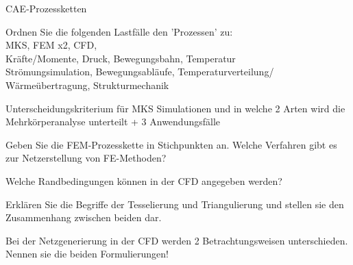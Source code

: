 \documentclass[
	ngerman,
	color = black,
	]{tudaexercise}
\begin{document}
\begin{task}[credit=18{,}5 P]{CAE-Prozessketten}
	\begin{subtask}[credit=2 P]
		Ordnen Sie die folgenden Lastfälle den 'Prozessen' zu: \\
		MKS, FEM x2, CFD, \\
		Kräfte/Momente, Druck, Bewegungsbahn, Temperatur \\
		Strömungsimulation, Bewegungsabläufe, Temperaturverteilung/ Wärmeübertragung, Strukturmechanik %
	\end{subtask}
	
	\begin{subtask}[credit=4 P]
		Unterscheidungskriterium für MKS Simulationen und in welche 2 Arten wird die Mehrkörperanalyse unterteilt
		+ 3 Anwendungsfälle %
	\end{subtask}	
	
	\begin{subtask}[credit=4 P]
		Geben Sie die FEM-Prozesskette in Stichpunkten an.
		Welche Verfahren gibt es zur Netzerstellung von FE-Methoden?
	\end{subtask}
	
	\begin{subtask}[credit=2{,}5 P]
		Welche Randbedingungen können in der CFD angegeben werden?
	\end{subtask}
	
	\begin{subtask}[credit=4 P]
		Erklären Sie die Begriffe der Tesselierung und Triangulierung und stellen sie den Zusammenhang zwischen beiden dar. %
	\end{subtask}
	
	\begin{subtask}[credit=2 P]
		Bei der Netzgenerierung in der CFD werden 2 Betrachtungsweisen unterschieden.
		Nennen sie die beiden Formulierungen!
	\end{subtask}
\end{task}
\end{document}
